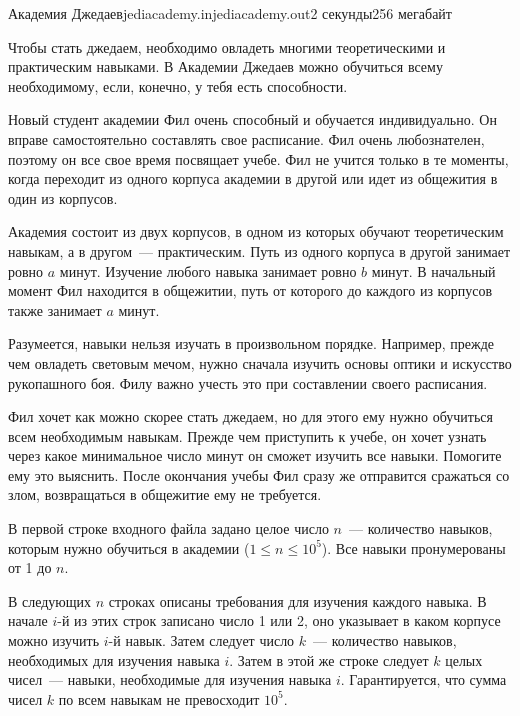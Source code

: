 \begin{problem}{Академия Джедаев}{jediacademy.in}{jediacademy.out}{2 секунды}{256 мегабайт}


Чтобы стать джедаем, необходимо овладеть многими теоретическими и практическим навыками.
В Академии Джедаев можно обучиться всему необходимому, если, конечно, у тебя есть способности.

Новый студент академии Фил очень способный и обучается индивидуально. Он вправе самостоятельно 
составлять свое расписание. Фил очень любознателен, поэтому он все свое время посвящает учебе.
Фил не учится только в те моменты, когда переходит из одного корпуса академии в другой или
идет из общежития в один из корпусов.
 
Академия состоит из двух корпусов, в одном из которых обучают теоретическим навыкам, а в другом~---
практическим. Путь из одного корпуса в другой занимает ровно $a$ минут. Изучение любого 
навыка занимает ровно $b$ минут. В начальный момент Фил находится в общежитии, 
путь от которого до каждого из корпусов также занимает $a$ минут.

Разумеется, навыки нельзя изучать в произвольном порядке. Например, прежде чем овладеть 
световым мечом, нужно сначала изучить основы оптики и искусство рукопашного боя. Филу
важно учесть это при составлении своего расписания. 

Фил хочет как можно скорее стать джедаем, но для этого ему нужно обучиться всем необходимым навыкам.
Прежде чем приступить к учебе, он хочет узнать через какое минимальное число минут он сможет изучить 
все навыки. Помогите ему это выяснить. После окончания учебы Фил сразу же отправится
сражаться со злом, возвращаться в общежитие ему не требуется.

\InputFile                                                     
В первой строке входного файла задано целое число $n$~--- количество навыков, которым нужно обучиться в академии
($1 \le n \le 10^5$). Все навыки пронумерованы от 1 до $n$.

В следующих $n$ строках описаны требования для изучения каждого навыка. В начале $i$-й из
этих строк записано число 1 или 2, оно указывает в каком корпусе можно изучить $i$-й навык. 
Затем следует число $k$~--- количество навыков, необходимых для изучения навыка $i$. Затем 
в этой же строке следует $k$ целых чисел~--- навыки, 
необходимые для изучения навыка $i$. 
Гарантируется, что сумма чисел $k$ по всем навыкам не превосходит $10^5$. 


\end{problem}
